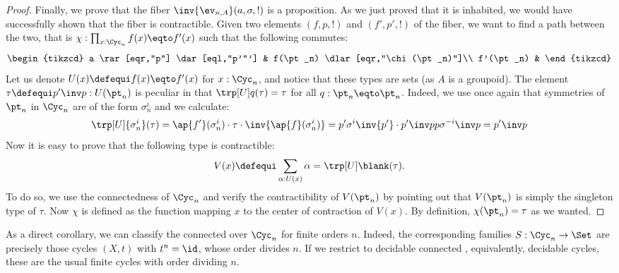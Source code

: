 \begin{proof}
  Finally, we prove that the fiber $\inv{\ev_{n,A}}(a,\sigma,!)$ is a
  proposition. As we just proved that it is inhabited, we would have
  successfully shown that the fiber is contractible. Given two elements
  $(f,p,!)$ and $(f',p',!)$ of the fiber, we want to find a path between the
  two, that is $\chi:\prod_{x:\Cyc_n} f(x) \eqto f'(x)$ such that the following
  commutes:
  \begin{displaymath}
    \begin{tikzcd}
      a \rar[eqr,"p"] \dar[eql,"p'"'] & f(\pt_n) \dlar[eqr,"\chi(\pt_n)"]\\
      f'(\pt_n) &
    \end{tikzcd}
  \end{displaymath}
  Let us denote $U(x)\defequi f(x) \eqto f'(x)$ for $x:\Cyc_n$, and notice that
  these types are sets (as $A$ is a groupoid). The element $\tau\defequi p'\inv
  p : U(\pt_n)$ is peculiar in that  $\trp[U] q (\tau) = \tau$ for all $q:\pt_n\eqto\pt_n$.
  Indeed, we use once
  again that symmetries of $\pt_n$ in $\Cyc_n$ are of the form $\sigma_n^i$ and
  we calculate:
  \begin{displaymath}
    \trp[U] {\sigma_n^i} (\tau) = \ap {f'} (\sigma_n^i) \cdot \tau \cdot \inv{\ap {f}(\sigma_n^i)}
    = p' \sigma^i \inv {p'} \cdot p'\inv p p \sigma^{-i} \inv p = p' \inv p
  \end{displaymath}
  Now it is easy to prove that the following type is contractible:
  \begin{displaymath}
    V(x) \defequi \sum_{\alpha: U(x)} \alpha = \trp[U] \blank (\tau).
  \end{displaymath}
  To do so, we use the connectedness of $\Cyc_n$ and verify the contractibility
  of $V(\pt_n)$ by pointing out that $V(\pt_n)$ is simply the singleton type of
  $\tau$. Now $\chi$ is defined as the function mapping $x$ to the center of
  contraction of $V(x)$. By definition, $\chi(\pt_n) = \tau$ as we wanted.
\end{proof}

As a direct corollary, we can classify the connected \coverings over $\Cyc_n$ for finite orders $n$.
Indeed, the corresponding families $S : \Cyc_n \to \Set$ are precisely those cycles $(X,t)$
with $t^n=\id$, \ie whose order divides $n$.
If we restrict to decidable connected \coverings, equivalently, decidable cycles,
these are the usual finite cycles with order dividing $n$.

